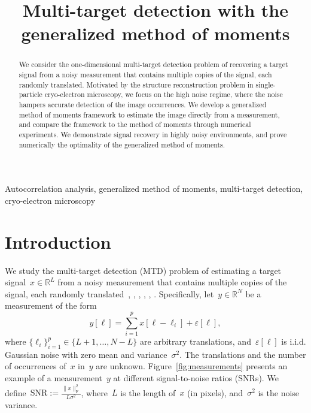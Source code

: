 \documentclass{article}
\title{Multi-target detection with the generalized method of moments}
\begin{document}
%
\maketitle
%
\begin{abstract}
We consider the one-dimensional multi-target detection problem of recovering a target signal from a noisy measurement that contains multiple copies of the signal, each randomly translated. Motivated by the structure reconstruction problem in single-particle cryo-electron microscopy, we focus on the high noise regime, where the noise hampers accurate detection of the image occurrences. We develop a generalized method of moments framework to estimate the image directly from a measurement, and compare the framework to the method of moments through numerical experiments. We demonstrate signal recovery in highly noisy environments, and prove numerically the optimality of the generalized method of moments.
\end{abstract}
%
\begin{keywords}
Autocorrelation analysis, generalized method of moments, multi-target detection, cryo-electron microscopy
\end{keywords}
%
\section{Introduction}
\label{sec:intro}
We study the multi-target detection (MTD) problem of estimating a target signal~$x \in \mathbb{R}^L$ from a noisy measurement that contains multiple copies of the signal, each randomly translated~\cite{bendory2019multi}, \cite{lan2020multi}, \cite{marshall2020image}, \cite{bendory2021multi}, \cite{kreymer2021two}, \cite{bendory2018toward}. Specifically, let~$y \in \mathbb{R}^N$ be a measurement of the form
\begin{equation}
\label{eq:model}
y[\ell] = \sum_{i=1}^{p} x[\ell - \ell_i] + \varepsilon[\ell],
\end{equation}
where \mbox{$\{\ell_i\}_{i=1}^{p} \in \{L + 1, \ldots, N-L\}$} are arbitrary translations, and~$\varepsilon[\ell]$ is i.i.d. Gaussian noise with zero mean and \mbox{variance~$\sigma^2$}. The translations and the number of occurrences of~$x$ in~$y$ are unknown. Figure~\ref{fig:measurements} presents an example of a measurement~$y$ at different signal-to-noise ratios (SNRs). We define~\mbox{$\text{SNR} := \frac{\|x\|_\text{F}^2}{L \sigma^2}$}, where~$L$ is the length of~$x$ (in pixels), and~$\sigma^2$ is the noise variance.
\end{document}
